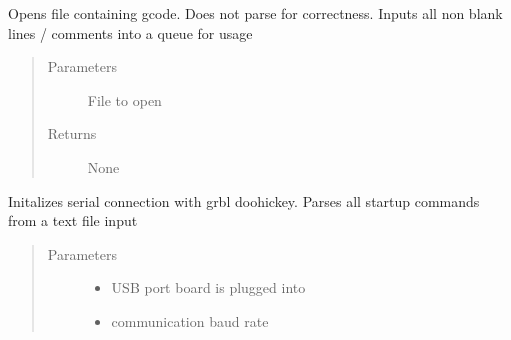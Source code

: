 \documentclass[letterpaper,10pt,english]{sphinxmanual}
\begin{document}
\begin{fulllineitems}
\begin{fulllineitems}
\begin{quote}
\begin{description}
\end{description}\end{quote}

\end{fulllineitems}


\begin{fulllineitems}
\label{\detokenize{index:droogCNC.TwoAxisStage.getFile}}
\sphinxAtStartPar
Opens file containing gcode. Does not parse for correctness.
Inputs all non blank lines / comments into a queue for usage
\begin{quote}\begin{description}
\item[{Parameters}] \leavevmode
\sphinxAtStartPar
{} \textendash{} File to open

\item[{Returns}] \leavevmode
\sphinxAtStartPar
None

\end{description}\end{quote}

\end{fulllineitems}


\begin{fulllineitems}
\label{\detokenize{index:droogCNC.TwoAxisStage.initSerial}}
\sphinxAtStartPar
Initalizes serial connection with grbl doohickey. Parses all startup commands from a text file input
\begin{quote}\begin{description}
\item[{Parameters}] \leavevmode\begin{itemize}
\item {} 
\sphinxAtStartPar
{} \textendash{} USB port board is plugged into

\item {} 
\sphinxAtStartPar
{} \textendash{} communication baud rate


\end{itemize}
\end{description}
\end{quote}
\end{fulllineitems}
\end{fulllineitems}
\end{document}
